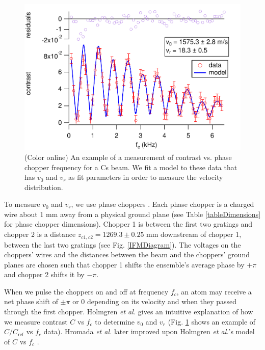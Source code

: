 \documentclass[twocolumn,prl,showpacs,superscriptaddress]{revtex4-1}   %
\newcommand{\figref}[1]{Fig. \ref{#1}}
\newcommand{\etal}{\textit{et al.}}
\newcommand{\etalspace}{\textit{et al. }}
\begin{document}

\begin{figure}
\includegraphics[width=\linewidth,keepaspectratio]{CvCF_150420_o.pdf}
\caption{\label{CvCFExample}(Color online) An example of a measurement of contrast vs. phase chopper frequency for a Cs beam. We fit a model to these data that has $v_0$ and $v_r$ as fit parameters in order to measure the velocity distribution.}
\end{figure}

To measure $v_0$ and $v_r$, we use phase choppers \cite{Holmgren2011,Hromada2014}. Each phase chopper is a charged wire about 1 mm away from a physical ground plane (see Table \ref{tableDimensions} for phase chopper dimensions). Chopper 1 is between the first two gratings and chopper 2 is a distance $z_{c1,c2} = 1269.3 \pm 0.25$ mm downstream of chopper 1, between the last two gratings (see \figref{IFMDiagram}). The voltages on the choppers' wires and the distances between the beam and the choppers' ground planes are chosen such that chopper 1 shifts the ensemble's average phase by $+\pi$ and chopper 2 shifts it by $-\pi$. 

When we pulse the choppers on and off at frequency $f_c$, an atom may receive a net phase shift of $\pm\pi$ or $0$ depending on its velocity and when they passed through the first chopper. 
Holmgren \etalspace gives an intuitive explanation of how
we measure contrast $C$ vs $f_c$ to determine $v_0$ and $v_r$ \cite{Holmgren2011} (\figref{CvCFExample} shows an example of $C/C_{\mathrm{ref}}$ vs $f_c$ data). Hromada \etalspace later improved upon Holmgren \etal's model of $C$ vs $f_c$ \cite{Hromada2014}.
\end{document}
